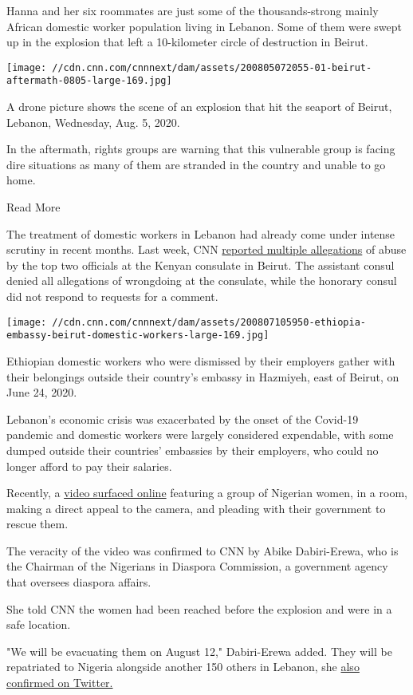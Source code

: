 Hanna and her six roommates are just some of the thousands-strong mainly
African domestic worker population living in Lebanon. Some of them were
swept up in the explosion that left a 10-kilometer circle of destruction
in Beirut.

\texttt{[image: //cdn.cnn.com/cnnnext/dam/assets/200805072055-01-beirut-aftermath-0805-large-169.jpg]}

A drone picture shows the scene of an explosion that hit the seaport of
Beirut, Lebanon, Wednesday, Aug. 5, 2020.

In the aftermath, rights groups are warning that this vulnerable group
is facing dire situations as many of them are stranded in the country
and unable to go home.

Read More

The treatment of domestic workers in Lebanon had already come under
intense scrutiny in recent months. Last week, CNN
\href{/2020/07/28/middleeast/beirut-kenya-as-equals-intl/index.html}{reported
multiple allegations} of abuse by the top two officials at the Kenyan
consulate in Beirut. The assistant consul denied all allegations of
wrongdoing at the consulate, while the honorary consul did not respond
to requests for a comment.

\texttt{[image: //cdn.cnn.com/cnnnext/dam/assets/200807105950-ethiopia-embassy-beirut-domestic-workers-large-169.jpg]}

Ethiopian domestic workers who were dismissed by their employers gather
with their belongings outside their country's embassy in Hazmiyeh, east
of Beirut, on June 24, 2020.

Lebanon's economic crisis was exacerbated by the onset of the Covid-19
pandemic and domestic workers were largely considered expendable, with
some dumped outside their countries' embassies by their employers, who
could no longer afford to pay their salaries.

Recently, a \href{https://www.youtube.com/watch?v=S9ZINDysNrA}{video
surfaced online} featuring a group of Nigerian women, in a room, making
a direct appeal to the camera, and pleading with their government to
rescue them.

The veracity of the video was confirmed to CNN by Abike Dabiri-Erewa,
who is the Chairman of the Nigerians in Diaspora Commission, a
government agency that oversees diaspora affairs.

She told CNN the women had been reached before the explosion and were in
a safe location.

"We will be evacuating them on August 12," Dabiri-Erewa added. They will
be repatriated to Nigeria alongside another 150 others in Lebanon, she
\href{https://twitter.com/abikedabiri/status/1290660392289677318}{also
confirmed on Twitter.}

